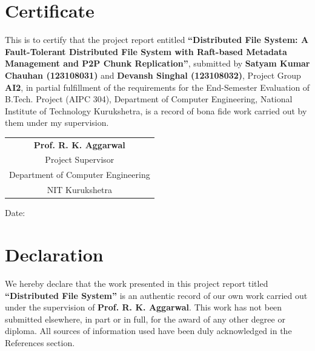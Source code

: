 \documentclass[12pt,a4paper]{report}
\begin{document}
\chapter*{Certificate}

This is to certify that the project report entitled \textbf{``Distributed File System: A Fault-Tolerant Distributed File System with Raft-based Metadata Management and P2P Chunk Replication''}, submitted by \textbf{Satyam Kumar Chauhan (123108031)} and \textbf{Devansh Singhal (123108032)}, Project Group \textbf{AI2}, in partial fulfillment of the requirements for the End-Semester Evaluation of B.Tech. Project (AIPC 304), Department of Computer Engineering, National Institute of Technology Kurukshetra, is a record of bona fide work carried out by them under my supervision.

\vspace{2cm}

\begin{flushright}
\begin{tabular}{c}
    \hline
    \textbf{Prof. R. K. Aggarwal} \\
    Project Supervisor \\
    Department of Computer Engineering \\
    NIT Kurukshetra
\end{tabular}
\end{flushright}

\vspace{1cm}
Date: \underline{\hspace{4cm}}

\chapter*{Declaration}

We hereby declare that the work presented in this project report titled \textbf{``Distributed File System''} is an authentic record of our own work carried out under the supervision of \textbf{Prof. R. K. Aggarwal}. This work has not been submitted elsewhere, in part or in full, for the award of any other degree or diploma. All sources of information used have been duly acknowledged in the References section.

\vspace{2cm}
\end{document}
